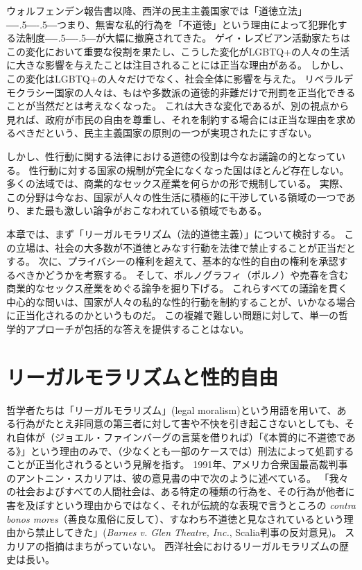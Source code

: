 \documentclass[paper=a4,book,openany]{jlreq}
\def\DDASH{―\kern-.5\zw―\kern-.5\zw―} %
\begin{document}
ウォルフェンデン報告書以降、西洋の民主主義国家では「道徳立法」{\DDASH}つまり、無害な私的行為を「不道徳」という理由によって犯罪化する法制度{\DDASH}が大幅に撤廃されてきた。
ゲイ・レズビアン活動家たちはこの変化において重要な役割を果たし、こうした変化がLGBTQ+の人々の生活に大きな影響を与えたことは注目されることには正当な理由がある。
しかし、この変化はLGBTQ+の人々だけでなく、社会全体に影響を与えた。
リベラルデモクラシー国家の人々は、もはや多数派の道徳的非難だけで刑罰を正当化できることが当然だとは考えなくなった。
これは大きな変化であるが、別の視点から見れば、政府が市民の自由を尊重し、それを制約する場合には正当な理由を求めるべきだという、民主主義国家の原則の一つが実現されたにすぎない。

しかし、性行動に関する法律における道徳の役割は今なお議論の的となっている。
性行動に対する国家の規制が完全になくなった国はほとんど存在しない。
多くの法域では、商業的なセックス産業を何らかの形で規制している。
実際、この分野は今なお、国家が人々の性生活に積極的に干渉している領域の一つであり、また最も激しい論争がおこなわれている領域でもある。

本章では、まず「リーガルモラリズム（法的道徳主義）」について検討する。
この立場は、社会の大多数が不道徳とみなす行動を法律で禁止することが正当だとする。
次に、プライバシーの権利を超えて、基本的な性的自由の権利を承認するべきかどうかを考察する。
そして、ポルノグラフィ（ポルノ）や売春を含む商業的なセックス産業をめぐる論争を掘り下げる。
これらすべての議論を貫く中心的な問いは、国家が人々の私的な性的行動を制約することが、いかなる場合に正当化されるのかというものだ。
この複雑で難しい問題に対して、単一の哲学的アプローチが包括的な答えを提供することはない。

\section{リーガルモラリズムと性的自由}

哲学者たちは「リーガルモラリズム」(legal moralism)という用語を用いて、ある行為がたとえ非同意の第三者に対して害や不快を引き起こさないとしても、それ自体が（ジョエル・ファインバーグの言葉を借りれば）「《本質的に不道徳である》」という理由のみで、（少なくとも一部のケースでは）刑法によって処罰することが正当化されうるという見解を指す\citep[p.249]{feinberg87:_some_unswep_debris_hart_devlin_debat}。
1991年、アメリカ合衆国最高裁判事のアントニン・スカリアは、彼の意見書の中で次のように述べている。
「我々の社会およびすべての人間社会は、ある特定の種類の行為を、その行為が他者に害を及ぼすという理由からではなく、それが伝統的な表現で言うところの \emph{contra bonos mores}（善良な風俗に反して）、すなわち不道徳と見なされているという理由から禁止してきた」(\emph{Barnes v. Glen Theatre, Inc.}, Scalia判事の反対意見)。
スカリアの指摘はまちがっていない。
西洋社会におけるリーガルモラリズムの歴史は長い。
\end{document}

